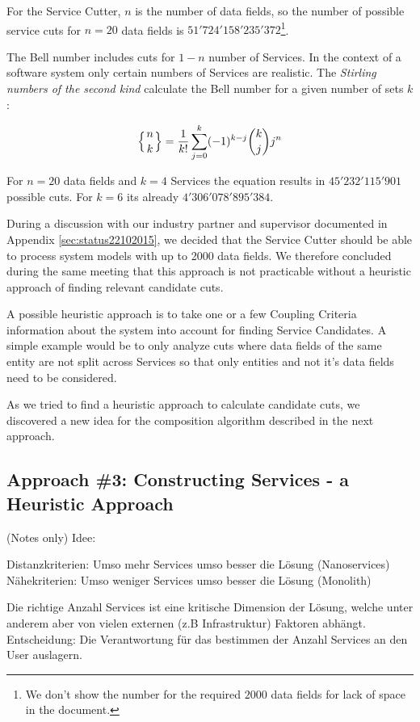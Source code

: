 For the Service Cutter, $n$ is the number of data fields, so the number of possible service cuts for $n=20$ data fields is $51'724'158'235'372$\footnote{We don't show the number for the required $2000$ data fields for lack of space in the document.}.

The Bell number includes cuts for $1 - n$ number of Services. In the context of a software system only certain numbers of Services are realistic. The \textit{Stirling numbers of the second kind} calculate the Bell number for a given number of sets $k$:

\begin{displaymath}
\left\{ {n \atop k}\right\} = \frac{1}{k!}\sum_{j=0}^{k} (-1)^{k-j} \binom{k}{j} j^n
\end{displaymath}

For $n=20$ data fields and $k=4$ Services the equation results in $45'232'115'901$ possible cuts. For $k=6$ its already $4'306'078'895'384$.

During a discussion with our industry partner and supervisor documented in Appendix \ref{sec:status22102015}, we decided that the Service Cutter should be able to process system models with up to 2000 data fields. We therefore concluded during the same meeting that this approach is not practicable without a heuristic approach of finding relevant candidate cuts. 

A possible heuristic approach is to take one or a few Coupling Criteria information about the system into account for finding Service Candidates. A simple example would be to only analyze cuts where data fields of the same entity are not split across Services so that only entities and not it's data fields need to be considered.

As we tried to find a heuristic approach to calculate candidate cuts, we discovered a new idea for the composition algorithm described in the next approach. 

\subsection{Approach \#3: Constructing Services - a Heuristic Approach}

(Notes only)
Idee:

Distanzkriterien: Umso mehr Services umso besser die Lösung (Nanoservices)
Nähekriterien: Umso weniger Services umso besser die Lösung (Monolith)

Die richtige Anzahl Services ist eine kritische Dimension der Lösung, welche unter anderem aber von vielen externen (z.B Infrastruktur) Faktoren abhängt. Entscheidung: Die Verantwortung für das bestimmen der Anzahl Services an den User auslagern.

